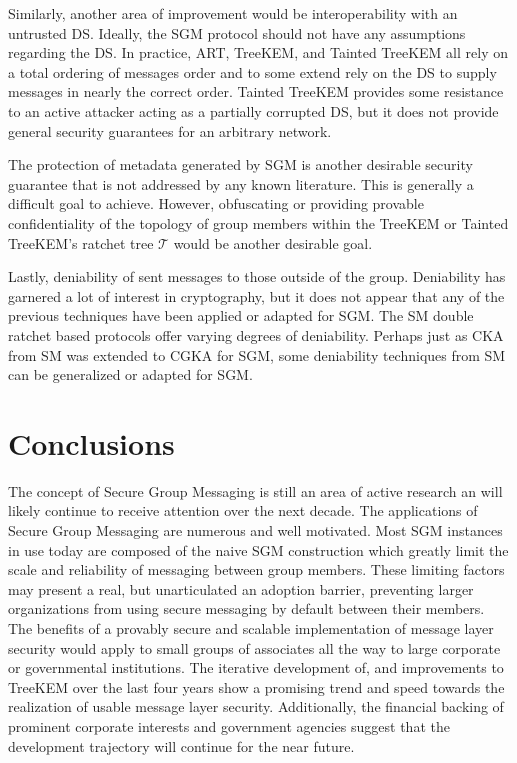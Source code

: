 \documentclass[12pt,twocolumn]{article}
\begin{document}
	Similarly, another area of improvement would be interoperability with an untrusted DS.
	Ideally, the SGM protocol should not have any assumptions regarding the DS.
	In practice, ART, TreeKEM, and Tainted TreeKEM all rely on a total ordering of messages order and to some extend rely on the DS to supply messages in nearly the correct order.
	Tainted TreeKEM provides some resistance to an active attacker acting as a partially corrupted DS, but it does not provide general security guarantees for an arbitrary network. 

	The protection of metadata generated by SGM is another desirable security guarantee that is not addressed by any known literature.
	This is generally a difficult goal to achieve.
	However, obfuscating or providing provable confidentiality of the topology of group members within the TreeKEM or Tainted TreeKEM's ratchet tree $\mathcal{T}$ would be another desirable goal.
	
	Lastly, deniability of sent messages to those outside of the group.
	Deniability has garnered a lot of interest in cryptography, but it does not appear that any of the previous techniques have been applied or adapted for SGM.
	The SM double ratchet based protocols offer varying degrees of deniability.
	Perhaps just as CKA from SM was extended to CGKA for SGM, some deniability techniques from SM can be generalized or adapted for SGM.
	
	\vfill

	\section*{Conclusions}
	
	The concept of Secure Group Messaging is still an area of active research an will likely continue to receive attention over the next decade.
	The applications of Secure Group Messaging are numerous and well motivated.
	Most SGM instances in use today are composed of the naive SGM construction which greatly limit the scale and reliability of messaging between group members.
	These limiting factors may present a real, but unarticulated an adoption barrier, preventing larger organizations from using secure messaging by default between their members.
	The benefits of a provably secure and scalable implementation of message layer security would apply to small groups of associates all the way to large corporate or governmental institutions.
	The iterative development of, and improvements to TreeKEM over the last four years show a promising trend and speed towards the realization of usable message layer security.
	Additionally, the financial backing of prominent corporate interests and government agencies suggest that the development trajectory will continue for the near future.
	
\end{document}
